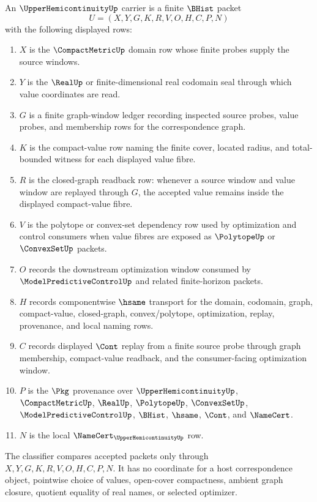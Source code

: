 \begin{definition}
\label{def:upperhemicontinuity-carrier}
An $\UpperHemicontinuityUp$ carrier is a finite $\BHist$ packet
$$
U=(X,Y,G,K,R,V,O,H,C,P,N)
$$
with the following displayed rows:
\begin{enumerate}
\item $X$ is the $\CompactMetricUp$ domain row whose finite probes supply the source windows.
\item $Y$ is the $\RealUp$ or finite-dimensional real codomain seal through which value coordinates are read.
\item $G$ is a finite graph-window ledger recording inspected source probes, value probes, and membership rows for the correspondence graph.
\item $K$ is the compact-value row naming the finite cover, located radius, and total-bounded witness for each displayed value fibre.
\item $R$ is the closed-graph readback row: whenever a source window and value window are replayed through $G$, the accepted value remains inside the displayed compact-value fibre.
\item $V$ is the polytope or convex-set dependency row used by optimization and control consumers when value fibres are exposed as $\PolytopeUp$ or $\ConvexSetUp$ packets.
\item $O$ records the downstream optimization window consumed by $\ModelPredictiveControlUp$ and related finite-horizon packets.
\item $H$ records componentwise $\hsame$ transport for the domain, codomain, graph, compact-value, closed-graph, convex/polytope, optimization, replay, provenance, and local naming rows.
\item $C$ records displayed $\Cont$ replay from a finite source probe through graph membership, compact-value readback, and the consumer-facing optimization window.
\item $P$ is the $\Pkg$ provenance over $\UpperHemicontinuityUp$, $\CompactMetricUp$, $\RealUp$, $\PolytopeUp$, $\ConvexSetUp$, $\ModelPredictiveControlUp$, $\BHist$, $\hsame$, $\Cont$, and $\NameCert$.
\item $N$ is the local $\NameCert_{\UpperHemicontinuityUp}$ row.
\end{enumerate}
The classifier compares accepted packets only through $X,Y,G,K,R,V,O,H,C,P,N$. It has no coordinate for a host correspondence object, pointwise choice of values, open-cover compactness, ambient graph closure, quotient equality of real names, or selected optimizer.
\end{definition}

